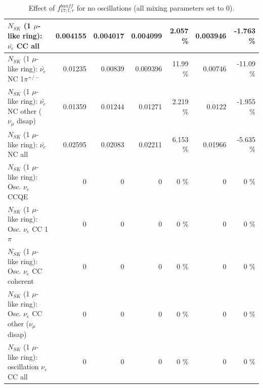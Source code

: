 \begin{table}
\begin{tabular}{| l | r | r | r  r | r  r |}
                            $N_{SK}$ (1 $\mu$-like ring): $\bar{\nu_{e}}$ CC all &        0.004155 &        0.004017 &        0.004099 &    2.057 \%  &        0.003946 &   -1.763 \%  \\ 
\hline
                     $N_{SK}$ (1 $\mu$-like ring): $\bar{\nu_e}$ NC 1$\pi^{+/-}$ &         0.01235 &         0.00839 &        0.009396 &    11.99 \%  &         0.00746 &   -11.09 \%  \\ 
          $N_{SK}$ (1 $\mu$-like ring): $\bar{\nu_e}$ NC other ($\nu_\mu$ disap) &         0.01359 &         0.01244 &         0.01271 &    2.219 \%  &          0.0122 &   -1.955 \%  \\ 
                            $N_{SK}$ (1 $\mu$-like ring): $\bar{\nu_{e}}$ NC all &         0.02595 &         0.02083 &         0.02211 &    6.153 \%  &         0.01966 &   -5.635 \%  \\ 
\hline
\hline
\hline
                                 $N_{SK}$ (1 $\mu$-like ring): Osc. $\nu_e$ CCQE &               0 &               0 &               0 &        0 \%  &               0 &        0 \%  \\ 
                            $N_{SK}$ (1 $\mu$-like ring): Osc. $\nu_e$ CC 1$\pi$ &               0 &               0 &               0 &        0 \%  &               0 &        0 \%  \\ 
                          $N_{SK}$ (1 $\mu$-like ring): Osc. $\nu_e$ CC coherent &               0 &               0 &               0 &        0 \%  &               0 &        0 \%  \\ 
           $N_{SK}$ (1 $\mu$-like ring): Osc. $\nu_e$ CC other ($\nu_\mu$ disap) &               0 &               0 &               0 &        0 \%  &               0 &        0 \%  \\ 
                        $N_{SK}$ (1 $\mu$-like ring): oscillation $\nu_e$ CC all &               0 &               0 &               0 &        0 \%  &               0 &        0 \%  \\ 
\hline
\hline
\end{tabular}
\caption{ Effect of $f_{17; t, r}^{banff}$ for no oscillations (all mixing parameters set to 0). }
\label{tab:num_banff_mares_1RmuT_3f_osc_t13:0}
\end{table}
\clearpage
